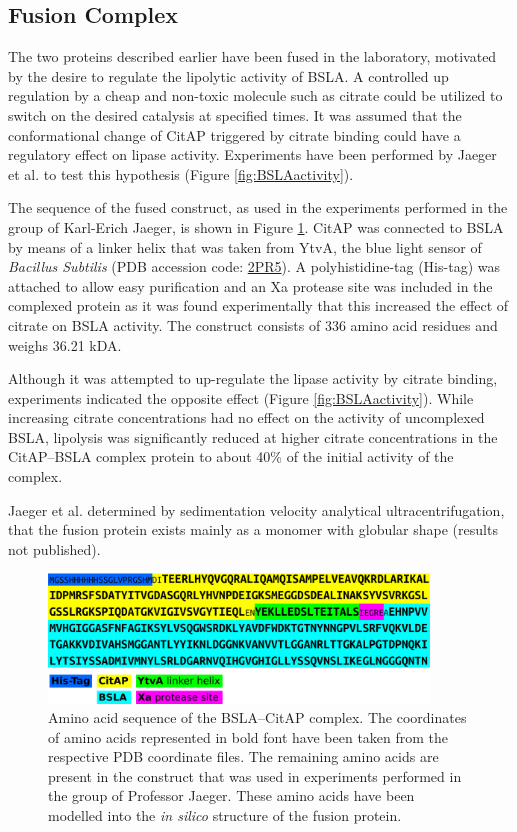 \documentclass[english, a4paper, 12pt, titlepage, draft]{article}
\newcommand{\PDB}[1]{\href{http://pdb.rcsb.org/pdb/explore/explore.do?structureId=#1}{#1}}
\begin{document}
\subsection{Fusion Complex}

The two proteins described earlier have been fused in the laboratory, motivated by the desire to regulate the lipolytic activity of BSLA.
A controlled up regulation by a cheap and non-toxic molecule such as citrate could be utilized to switch on the desired catalysis at specified times.
It was assumed that the conformational change of CitAP triggered by citrate binding could have a regulatory effect on lipase activity.
Experiments have been performed by Jaeger et al. to test this hypothesis (Figure \ref{fig:BSLAactivity}).

The sequence of the fused construct, as used in the experiments performed in the group of Karl-Erich Jaeger, is shown in Figure \ref{fig:complex_sequence}.
CitAP was connected to BSLA by means of a linker helix that was taken from YtvA, the blue light sensor of \textit{Bacillus Subtilis} (PDB accession code: \PDB{2PR5}).
A polyhistidine-tag (His-tag) was attached to allow easy purification and
an Xa protease site was included in the complexed protein as it was found experimentally that this increased the effect of citrate on BSLA activity.
The construct consists of 336 amino acid residues and weighs 36.21 kDA.

Although it was attempted to up-regulate the lipase activity by citrate binding, experiments indicated the opposite effect (Figure \ref{fig:BSLAactivity}).
While increasing citrate concentrations had no effect on the activity of uncomplexed BSLA, lipolysis was significantly reduced at higher citrate concentrations in the CitAP--BSLA complex protein to about 40\% of the initial activity of the complex.

Jaeger et al. determined by sedimentation velocity analytical ultracentrifugation, that the fusion protein exists mainly as a monomer with globular shape (results not published).




\begin{figure}
    \centering
    \includegraphics[width=0.9\textwidth]{figures/Complex_sequence/Complex_sequence.pdf}
    \caption{Amino acid sequence of the BSLA--CitAP complex. The coordinates of amino acids represented in bold font have been taken from the respective PDB coordinate files.
    The remaining amino acids are present in the construct that was used in experiments performed in the group of Professor Jaeger. These amino acids have been modelled into the \emph{in silico} structure of the fusion protein.}
    \label{fig:complex_sequence}
\end{figure}       
\end{document}
